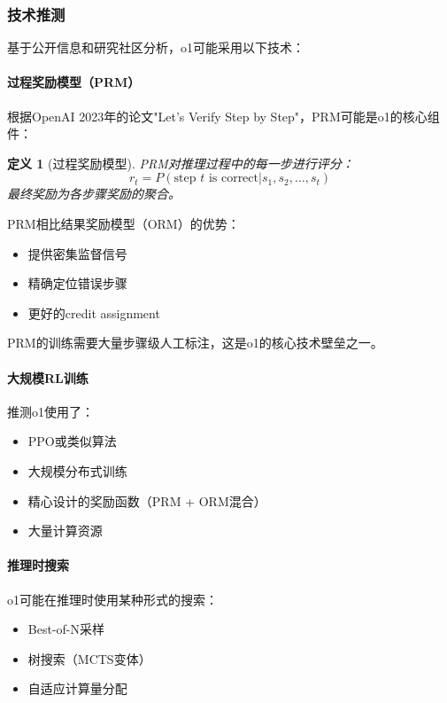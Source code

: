 \documentclass[12pt,a4paper]{article}
\newtheorem{definition}[theorem]{定义}
\begin{document}
\subsubsection{技术推测}

基于公开信息和研究社区分析，o1可能采用以下技术：

\paragraph{过程奖励模型（PRM）}

根据OpenAI 2023年的论文"Let's Verify Step by Step"，PRM可能是o1的核心组件：

\begin{definition}[过程奖励模型]
PRM对推理过程中的每一步进行评分：
\begin{equation}
r_t = P(\text{step } t \text{ is correct} | s_1, s_2, \ldots, s_t)
\end{equation}
最终奖励为各步骤奖励的聚合。
\end{definition}

PRM相比结果奖励模型（ORM）的优势：
\begin{itemize}
    \item 提供密集监督信号
    \item 精确定位错误步骤
    \item 更好的credit assignment
\end{itemize}

PRM的训练需要大量步骤级人工标注，这是o1的核心技术壁垒之一。

\paragraph{大规模RL训练}

推测o1使用了：
\begin{itemize}
    \item PPO或类似算法
    \item 大规模分布式训练
    \item 精心设计的奖励函数（PRM + ORM混合）
    \item 大量计算资源
\end{itemize}

\paragraph{推理时搜索}

o1可能在推理时使用某种形式的搜索：
\begin{itemize}
    \item Best-of-N采样
    \item 树搜索（MCTS变体）
    \item 自适应计算量分配
\end{itemize}
\end{document}
